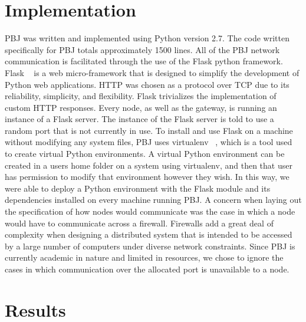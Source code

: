\documentclass{acm_proc_article-sp}
\begin{document}
\section{Implementation}
PBJ was written and implemented using Python version 2.7. The code written specifically for PBJ totals approximately 1500 lines.
All of the PBJ network communication is facilitated through the use of the Flask python framework. Flask ~\cite{flask} is a web micro-framework that is designed to simplify the development of Python web applications. HTTP was chosen as a protocol over TCP due to its reliability, simplicity, and flexibility. Flask trivializes the implementation of custom HTTP responses. Every node, as well as the gateway, is running an instance of a Flask server. The instance of the Flask server is told to use a random port that is not currently in use.
To install and use Flask on a machine without modifying any system files, PBJ uses virtualenv ~\cite{virtual}, which is a tool used to create virtual Python environments. A virtual Python environment can be created in a users home folder on a system using virtualenv, and then that user has permission to modify that environment however they wish. In this way, we were able to deploy a Python environment with the Flask module and its dependencies installed on every machine running PBJ.
A concern when laying out the specification of how nodes would communicate was the case in which a node would have to communicate across a firewall. Firewalls add a great deal of complexity when designing a distributed system that is intended to be accessed by a large number of computers under diverse network constraints. Since PBJ is currently academic in nature and limited in resources, we chose to ignore the cases in which communication over the allocated port is unavailable to a node.



\section{Results}
\end{document}
